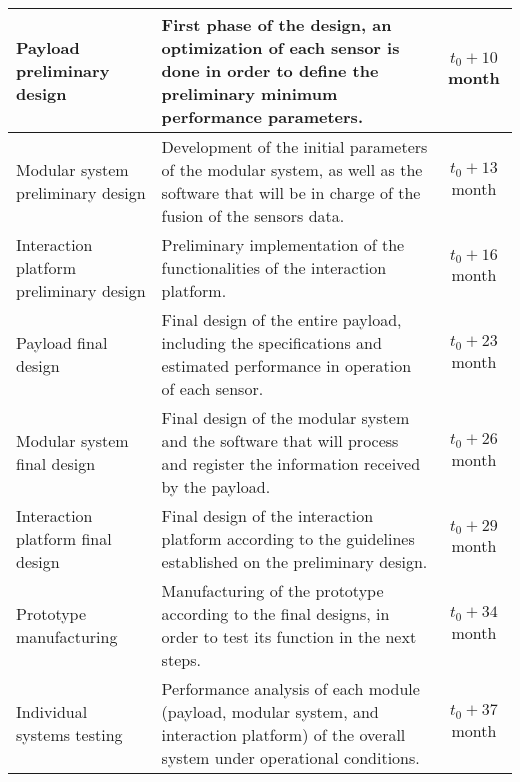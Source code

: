 \begin{longtable}[H]{>{\raggedright\arraybackslash}p{4cm} p{8cm} c}
	\midrule  
	
	Payload preliminary design & First phase of the design, an optimization of each sensor is done in order to define the preliminary minimum performance parameters.& $t_0 + 10$ month\vspace{0.2cm} \\
	
	\midrule
	
	Modular system preliminary design & Development of the initial parameters of the modular system, as well as the software that will be in charge of the fusion of the sensors data.& $t_0 + 13$ month\vspace{0.2cm} \\
	
	\midrule
	
	Interaction platform preliminary design & Preliminary implementation of the functionalities of the interaction platform.& $t_0 + 16$ month\vspace{0.2cm} \\
	
	\midrule
	
	Payload final design & Final design of the entire payload, including the specifications and estimated performance in operation of each sensor.& $t_0 + 23$ month\vspace{0.2cm} \\
	
	\midrule
	
	Modular system final design & Final design of the modular system and the software that will process and register the information received by the payload.& $t_0 + 26$ month\vspace{0.2cm} \\
	
	\midrule
	
	Interaction platform final design & Final design of the interaction platform according to the guidelines established on the preliminary design.& $t_0 + 29$ month\vspace{0.2cm} \\
	
	\midrule
	
	Prototype manufacturing & Manufacturing of the prototype according to the final designs, in order to test its function in the next steps.& $t_0 + 34$ month\vspace{0.2cm} \\
	
	\midrule
	
	Individual systems testing & Performance analysis of each module (payload, modular system, and interaction platform) of the overall system under operational conditions.& $t_0 + 37$ month\vspace{0.2cm} \\
	

\end{longtable}
